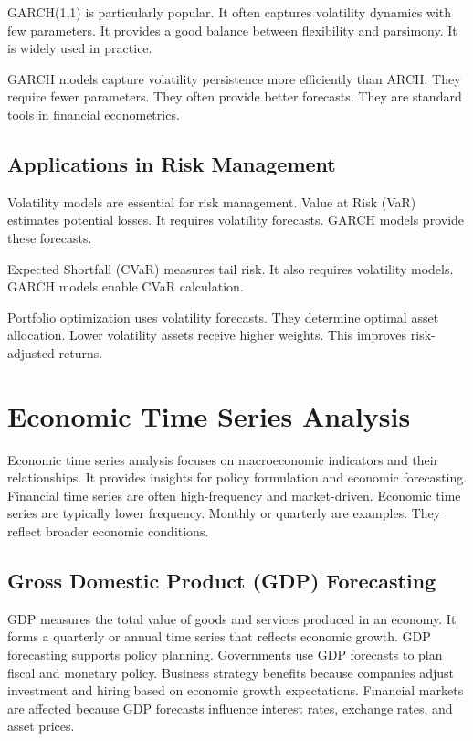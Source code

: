 GARCH(1,1) is particularly popular. It often captures volatility dynamics with few parameters. It provides a good balance between flexibility and parsimony. It is widely used in practice.

GARCH models capture volatility persistence more efficiently than ARCH. They require fewer parameters. They often provide better forecasts. They are standard tools in financial econometrics.

\subsection{Applications in Risk Management}

Volatility models are essential for risk management. Value at Risk (VaR) estimates potential losses. It requires volatility forecasts. GARCH models provide these forecasts.

Expected Shortfall (CVaR) measures tail risk. It also requires volatility models. GARCH models enable CVaR calculation.

Portfolio optimization uses volatility forecasts. They determine optimal asset allocation. Lower volatility assets receive higher weights. This improves risk-adjusted returns.

\section{Economic Time Series Analysis}

Economic time series analysis focuses on macroeconomic indicators and their relationships. It provides insights for policy formulation and economic forecasting. Financial time series are often high-frequency and market-driven. Economic time series are typically lower frequency. Monthly or quarterly are examples. They reflect broader economic conditions.

\subsection{Gross Domestic Product (GDP) Forecasting}

GDP measures the total value of goods and services produced in an economy. It forms a quarterly or annual time series that reflects economic growth. GDP forecasting supports policy planning. Governments use GDP forecasts to plan fiscal and monetary policy. Business strategy benefits because companies adjust investment and hiring based on economic growth expectations. Financial markets are affected because GDP forecasts influence interest rates, exchange rates, and asset prices.

